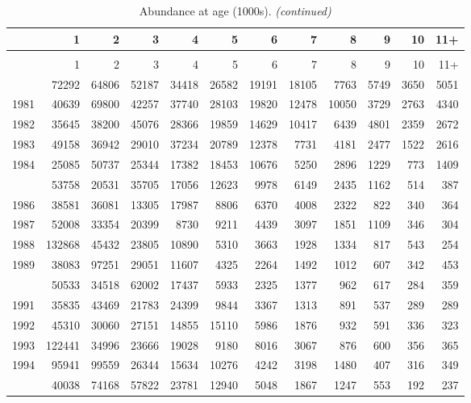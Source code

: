 \documentclass[
]{article}
\begin{document}
\begin{longtable}[t]{lrrrrrrrrrrr}
\caption{\label{tab:NAA-table}Abundance at age (1000s).}\\
\toprule
  & 1 & 2 & 3 & 4 & 5 & 6 & 7 & 8 & 9 & 10 & 11+\\
\midrule
\endfirsthead
\caption[]{Abundance at age (1000s). \textit{(continued)}}\\
\toprule
  & 1 & 2 & 3 & 4 & 5 & 6 & 7 & 8 & 9 & 10 & 11+\\
\midrule
\endhead

\endfoot
\bottomrule
\endlastfoot
1980 & 72292 & 64806 & 52187 & 34418 & 26582 & 19191 & 18105 & 7763 & 5749 & 3650 & 5051\\
1981 & 40639 & 69800 & 42257 & 37740 & 28103 & 19820 & 12478 & 10050 & 3729 & 2763 & 4340\\
1982 & 35645 & 38200 & 45076 & 28366 & 19859 & 14629 & 10417 & 6439 & 4801 & 2359 & 2672\\
1983 & 49158 & 36942 & 29010 & 37234 & 20789 & 12378 & 7731 & 4181 & 2477 & 1522 & 2616\\
1984 & 25085 & 50737 & 25344 & 17382 & 18453 & 10676 & 5250 & 2896 & 1229 & 773 & 1409\\
\addlinespace
1985 & 53758 & 20531 & 35705 & 17056 & 12623 & 9978 & 6149 & 2435 & 1162 & 514 & 387\\
1986 & 38581 & 36081 & 13305 & 17987 & 8806 & 6370 & 4008 & 2322 & 822 & 340 & 364\\
1987 & 52008 & 33354 & 20399 & 8730 & 9211 & 4439 & 3097 & 1851 & 1109 & 346 & 304\\
1988 & 132868 & 45432 & 23805 & 10890 & 5310 & 3663 & 1928 & 1334 & 817 & 543 & 254\\
1989 & 38083 & 97251 & 29051 & 11607 & 4325 & 2264 & 1492 & 1012 & 607 & 342 & 453\\
\addlinespace
1990 & 50533 & 34518 & 62002 & 17437 & 5933 & 2325 & 1377 & 962 & 617 & 284 & 359\\
1991 & 35835 & 43469 & 21783 & 24399 & 9844 & 3367 & 1313 & 891 & 537 & 289 & 289\\
1992 & 45310 & 30060 & 27151 & 14855 & 15110 & 5986 & 1876 & 932 & 591 & 336 & 323\\
1993 & 122441 & 34996 & 23666 & 19028 & 9180 & 8016 & 3067 & 876 & 600 & 356 & 365\\
1994 & 95941 & 99559 & 26344 & 15634 & 10276 & 4242 & 3198 & 1480 & 407 & 316 & 349\\
\addlinespace
1995 & 40038 & 74168 & 57822 & 23781 & 12940 & 5048 & 1867 & 1247 & 553 & 192 & 237\\

\end{longtable}
\end{document}

